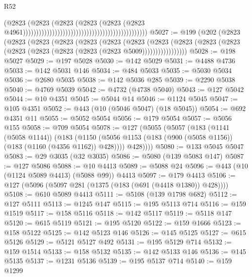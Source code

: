 \begin{lexlean}{R52}
\begin{coremodule}
                                                                                      (@2823
                                                                                        (@2823
                                                                                          (@2823
                                                                                            (@2823
                                                                                              (@2823
                                                                                                (@2823
                                                                                                  @4961)))))))))))))))))))))))))))))))))))))))))))))))
@5027 := @199
    (@202
      (@2823
        (@2823
          (@2823
            (@2823
              (@2823
                (@2823
                  (@2823
                    (@2823
                      (@2823 (@2823 (@2823 (@2823 (@2823 (@2823 (@2823 (@2823 @5009)))))))))))))))))
@5028 := @198 @5027
@5029 := @197 @5028
@5030 := @142 @5029
@5031 := @4488 @4736
@5033 := @142 @5031 @146
@5034 := @484 @5033
@5035 := @5030 @5034
@5036 := @2680 @5035
@5038 := @142 @5036 @285
@5039 := @2290 @5038
@5040 := @4769 @5039
@5042 := @4732 (@4738 @5040)
@5043 := @127 @5042
@5044 := @10 @4351
@5045 := @5044 @14
@5046 := @1124 @5045
@5047 := @105 @4351
@5052 := @443 (@10 (@5046 @5047) (@18 @5045))
@5054 := @692 @4351 @11
@5055 := @5052 @5054
@5056 := @179 @5054
@5057 := @5056 @155
@5058 := @709 @5054
@5078 := @127
    (@5055
      (@5057
        (@183
          (@1141 (@5058 @1144))
          (@183
            (@1150 (@5056 @1153 (@183 (@900 (@5058 @1156)) (@183 (@1160 (@4356 @1162)) @428))))
            @428))))
@5080 := @133 @5045 @5047
@5083 := @29 @3035 (@32 @3035)
@5086 := @5080 (@139 @5083 @147)
@5087 := @127 @5086
@5088 := @10 @4413
@5089 := @5088 @24
@5096 := @443 (@10 (@1124 @5089 @4413) (@5088 @99)) @4413
@5097 := @179 @4413
@5106 := @127 (@5096 (@5097 @281 (@1375 (@183 (@691 (@4418 @1380)) @428))))
@5108 := @610 @5089 @4413
@5111 := @5108 (@139 @1798 @682)
@5112 := @127 @5111
@5113 := @1245 @147
@5115 := @195 @5113 @714
@5116 := @159 @1519
@5117 := @158 @5116
@5118 := @142 @5117
@5119 := @5118 @147
@5120 := @615 @5119
@5121 := @195 @5120
@5122 := @159 @1666
@5123 := @158 @5122
@5125 := @142 @5123 @146
@5126 := @145 @5125
@5127 := @615 @5126
@5129 := @5121 @5127 @492
@5131 := @195 @5129 @714
@5132 := @159 @1514
@5133 := @158 @5132
@5135 := @142 @5133 @146
@5136 := @145 @5135
@5137 := @1231 @5136
@5139 := @195 @5137 @714
@5140 := @159 @1299

\end{coremodule}
\end{lexlean}

